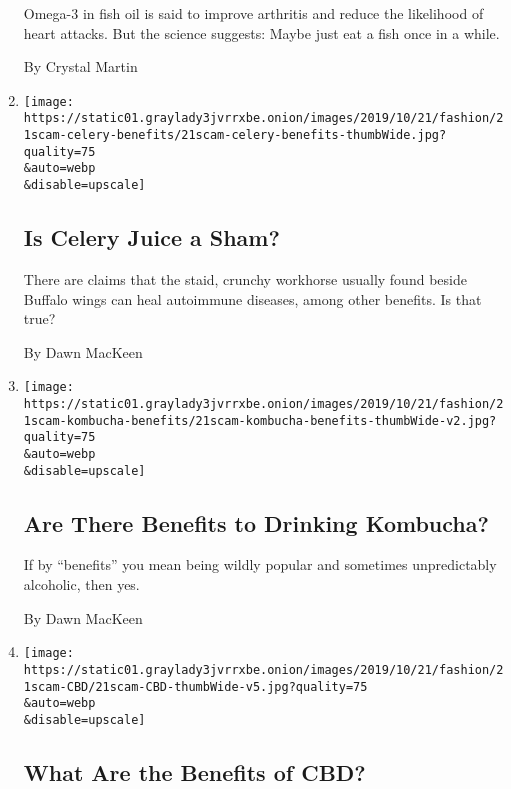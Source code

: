 \begin{enumerate}
  Omega-3 in fish oil is said to improve arthritis and reduce the
  likelihood of heart attacks. But the science suggests: Maybe just eat
  a fish once in a while.

  By Crystal Martin
\item
  \href{/2019/10/16/style/self-care/celery-juice-benefits.html}{}

  \texttt{[image: https://static01.graylady3jvrrxbe.onion/images/2019/10/21/fashion/21scam-celery-benefits/21scam-celery-benefits-thumbWide.jpg?quality=75\\\&auto=webp\\\&disable=upscale]}

  \hypertarget{is-celery-juice-a-sham}{%
  \subsection{Is Celery Juice a Sham?}\label{is-celery-juice-a-sham}}

  There are claims that the staid, crunchy workhorse usually found
  beside Buffalo wings can heal autoimmune diseases, among other
  benefits. Is that true?

  By Dawn MacKeen
\item
  \href{/2019/10/16/style/self-care/kombucha-benefits.html}{}

  \texttt{[image: https://static01.graylady3jvrrxbe.onion/images/2019/10/21/fashion/21scam-kombucha-benefits/21scam-kombucha-benefits-thumbWide-v2.jpg?quality=75\\\&auto=webp\\\&disable=upscale]}

  \hypertarget{are-there-benefits-to-drinking-kombucha}{%
  \subsection{Are There Benefits to Drinking
  Kombucha?}\label{are-there-benefits-to-drinking-kombucha}}

  If by ``benefits'' you mean being wildly popular and sometimes
  unpredictably alcoholic, then yes.

  By Dawn MacKeen
\item
  \href{/2019/10/16/style/self-care/cbd-oil-benefits.html}{}

  \texttt{[image: https://static01.graylady3jvrrxbe.onion/images/2019/10/21/fashion/21scam-CBD/21scam-CBD-thumbWide-v5.jpg?quality=75\\\&auto=webp\\\&disable=upscale]}

  \hypertarget{what-are-the-benefits-of-cbd}{%
  \subsection{What Are the Benefits of
  CBD?}\label{what-are-the-benefits-of-cbd}}


\end{enumerate}
